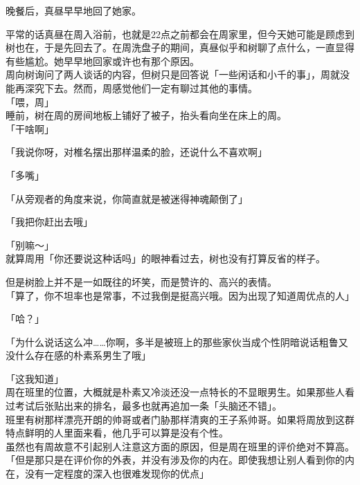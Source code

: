 晚餐后，真昼早早地回了她家。

平常的话真昼在周入浴前，也就是22点之前都会在周家里，但今天她可能是顾虑到树也在，于是先回去了。在周洗盘子的期间，真昼似乎和树聊了点什么，一直显得有些尴尬。她早早地回家或许也有那个原因。\\

周向树询问了两人谈话的内容，但树只是回答说「一些闲话和小千的事」，周就没能再深究下去。然而，周感觉他们一定有聊过其他的事情。\\

「喂，周」\\

睡前，树在周的房间地板上铺好了被子，抬头看向坐在床上的周。\\

「干啥啊」

「我说你呀，对椎名摆出那样温柔的脸，还说什么不喜欢啊」

「多嘴」

「从旁观者的角度来说，你简直就是被迷得神魂颠倒了」

「我把你赶出去哦」

「别嘛～」\\

就算周用「你还要说这种话吗」的眼神看过去，树也没有打算反省的样子。

但是树脸上并不是一如既往的坏笑，而是赞许的、高兴的表情。\\

「算了，你不坦率也是常事，不过我倒是挺高兴哦。因为出现了知道周优点的人」

「哈？」

「为什么说话这么冲……你啊，多半是被班上的那些家伙当成个性阴暗说话粗鲁又没什么存在感的朴素系男生了哦」

「这我知道」\\

周在班里的位置，大概就是朴素又冷淡还没一点特长的不显眼男生。如果那些人看过考试后张贴出来的排名，最多也就再追加一条「头脑还不错」。\\

班里有树那样漂亮开朗的帅哥或者门胁那样清爽的王子系帅哥。如果将周放到这群特点鲜明的人里面来看，他几乎可以算是没有个性。\\

虽然也有周故意不引起别人注意这方面的原因，但是周在班里的评价绝对不算高。\\

「但是那只是在评价你的外表，并没有涉及你的内在。即使我想让别人看到你的内在，没有一定程度的深入也很难发现你的优点」\\

